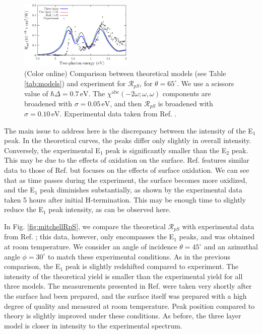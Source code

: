 \begin{figure}[b]
\centering
\includegraphics[width=0.48\textwidth]{figures/03-results/shgyield/fig3}
\caption{(Color online) Comparison between theoretical models (see Table
\ref{tab:models}) and experiment for $\mathcal{R}_{pS}$, for
$\theta=65^{\circ}$. We use a scissors value of $\hbar\Delta = 0.7\,\text{eV}$.
The $\chi^{\mathrm{abc}}(-2\omega;\omega,\omega)$ components are broadened with
$\sigma=0.05\,\text{eV}$, and then $\mathcal{R}_{pS}$ is broadened with
$\sigma=0.10\,\text{eV}$. Experimental data taken from Ref.
\cite{mejiaPRB02}.\label{fig:RpS}}
\end{figure}

The main issue to address here is the discrepancy between the intensity of the
E$_{1}$ peak. In the theoretical curves, the peaks differ only slightly in
overall intensity. Conversely, the experimental E$_{1}$ peak is significantly
smaller than the E$_{2}$ peak. This may be due to the effects of oxidation on
the surface. Ref. \cite{bergfeldPRL04} features similar data to those of
Ref. \cite{mejiaPRB02} but focuses on the effects of surface oxidation. We
can see that as time passes during the experiment, the surface becomes more
oxidized, and the E$_{1}$ peak diminishes substantially, as shown by the
experimental data taken 5 hours after initial H-termination. This may be enough
time to slightly reduce the E$_{1}$ peak intensity, as can be observed here.

In Fig. \ref{fig:mitchellRpS}, we compare the theoretical $\mathcal{R}_{pS}$
with experimental data from Ref. \cite{mitchellSS01}; this data, however,
only encompasses the E$_{1}$ peaks, and was obtained at room temperature. We
consider an angle of incidence $\theta=45^\circ$ and an azimuthal angle
$\phi=30^\circ$ to match these experimental conditions. As in the previous
comparison, the E$_{1}$ peak is slightly redshifted compared to experiment. The
intensity of the theoretical yield is smaller than the experimental yield for
all three models. The measurements presented in Ref. \cite{mitchellSS01}
were taken very shortly after the surface had been prepared, and the surface
itself was prepared with a high degree of quality and measured at room
temperature. Peak position compared to theory is slightly improved under these
conditions. As before, the three layer model is closer in intensity to the
experimental spectrum.

